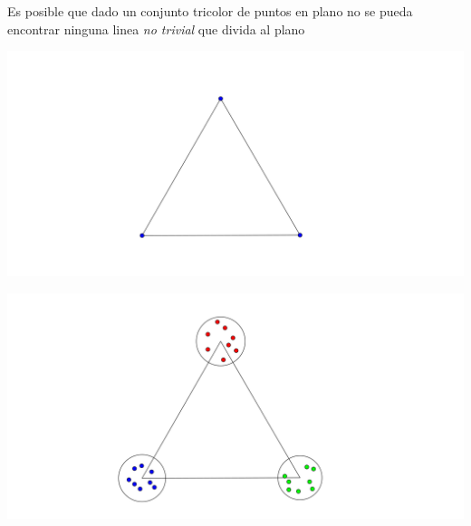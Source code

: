 \documentclass[xcolor=table]{beamer}
\begin{document}
\begin{mdframe}%

\noindent{}  Es posible que dado un conjunto tricolor de puntos en plano no se pueda encontrar
  ninguna linea \emph{no trivial} que divida al plano%
\end{mdframe}%

\begin{mdframe}%

\noindent{}\includegraphics[keepaspectratio=true,width=\dimwidth{1.00},height=\dimheight{1.00}]{images/non_trivial_cut00}{}%
\end{mdframe}%

\begin{mdframe}%

\noindent{}\includegraphics[keepaspectratio=true,width=\dimwidth{1.00},height=\dimheight{1.00}]{images/non_trivial_cut01}{}%
\end{mdframe}%
\end{document}
